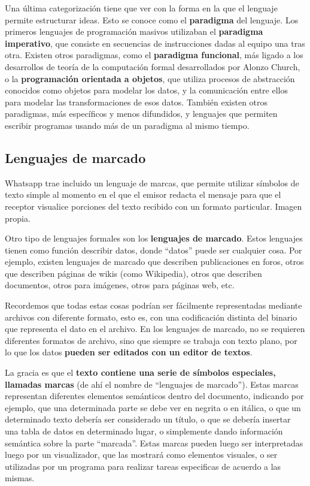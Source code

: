 Una última categorización tiene que ver con la forma en la que el lenguaje
permite estructurar ideas. Esto se conoce como el \textbf{paradigma} del lenguaje.
Los primeros lenguajes de programación masivos utilizaban el \textbf{paradigma
imperativo}, que consiste en secuencias de instrucciones dadas al equipo una tras
otra. Existen otros paradigmas, como el \textbf{paradigma funcional}, más ligado
a los desarrollos de teoría de la computación formal desarrollados por Alonzo
Church, o la \textbf{programación orientada a objetos}, que utiliza procesos
de abstracción conocidos como objetos para modelar los datos, y la comunicación
entre ellos para modelar las transformaciones de esos datos. También existen
otros paradigmas, más específicos y menos difundidos, y lenguajes que permiten
escribir programas usando más de un paradigma al mismo tiempo.


\subsection{Lenguajes de marcado}

{Whatsapp trae incluido un lenguaje de marcas, que permite utilizar símbolos
de texto simple al momento en el que el emisor redacta el mensaje para que el
receptor visualice porciones del texto recibido con un formato particular.}
{Imagen propia.}

Otro tipo de lenguajes formales son los \textbf{lenguajes de marcado}. Estos
lenguajes tienen como función describir datos, donde ``datos'' puede ser cualquier
cosa. Por ejemplo, existen lenguajes de marcado que describen publicaciones en foros,
otros que describen páginas de wikis (como Wikipedia), otros que describen
documentos, otros para imágenes, otros para páginas web, etc.

Recordemos que todas estas cosas podrían ser fácilmente representadas mediante
archivos con diferente formato, esto es, con una codificación distinta del
binario que representa el dato en el archivo. En los lenguajes de marcado,
no se requieren diferentes formatos de archivo, sino que siempre se trabaja
con texto plano, por lo que los datos \textbf{pueden ser editados con un editor
de textos}.

La gracia es que el \textbf{texto contiene una serie de símbolos especiales, llamadas
marcas} (de ahí el nombre de ``lenguajes de marcado''). Estas marcas representan
diferentes elementos semánticos dentro del documento, indicando por ejemplo, que
una determinada parte se debe ver en negrita o en itálica, o que un determinado
texto debería ser considerado un título, o que se debería insertar una tabla de
datos en determinado lugar, o simplemente dando información semántica sobre
la parte ``marcada''. Estas marcas pueden luego ser interpretadas luego por un
visualizador, que las mostrará como elementos visuales, o ser utilizadas por
un programa para realizar tareas especificas de acuerdo a las mismas.

